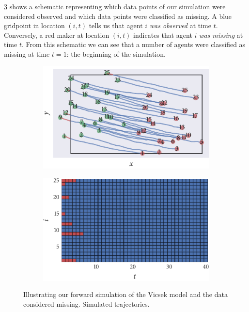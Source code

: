 \cref{subfig:beg_missing} shows a schematic representing which data points of
our simulation were considered observed and which data points were classified
as missing. A blue gridpoint in location $(i, t)$ tells us that agent $i$
\emph{was observed} at time $t$. Conversely, a red maker at location $(i, t)$
indicates that agent $i$ \emph{was missing} at time $t$. From this schematic we
can see that a number of agents were classified as missing at time $t=1$: the
beginning of the simulation.

\begin{figure}[tbp]
  \begin{subfigure}[b]{0.5\textwidth}
    \includegraphics{beg/data.pdf}
    \caption{}
    \label{subfig:beg_data}
  \end{subfigure}%
  \begin{subfigure}[b]{0.5\textwidth}
    \includegraphics{beg/missing_array.pdf}
    \caption{}
    \label{subfig:beg_missing}
  \end{subfigure}
  \caption{Illustrating our forward simulation of the Vicsek model and the
    data considered missing.  Simulated trajectories.
}
\end{figure}
